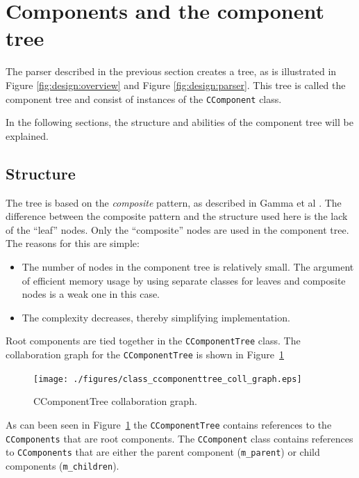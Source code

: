 \section{Components and the component tree} \label{sect:design:components}
The parser described in the previous section creates a tree, as is illustrated
in Figure \ref{fig:design:overview} and Figure \ref{fig:design:parser}. This
tree is called the component tree and consist of instances of the
\verb=CComponent= class.

In the following sections, the structure and abilities of the component tree
will be explained.

\subsection{Structure}
The tree is based on the \emph{composite} pattern, as described in Gamma et al
\cite{Gamma}. The difference between the composite pattern and the structure
used here is the lack of the ``leaf'' nodes. Only the ``composite'' nodes are
used in the component tree. The reasons for this are simple:
\begin{itemize}
\item The number of nodes in the component tree is relatively small. The
argument of efficient memory usage by using separate classes for leaves and
composite nodes is a weak one in this case.
\item The complexity decreases, thereby simplifying implementation.
\end{itemize}
Root components are tied together in the \verb=CComponentTree= class. The
collaboration graph for the \verb=CComponentTree= is shown in \mbox{Figure
\ref{fig:doxygen:CComponentTree_coll}}

\begin{figure}[ht]
\begin{center}
\texttt{[image: ./figures/class\_ccomponenttree\_coll\_graph.eps]}
\caption{CComponentTree collaboration graph.}
\label{fig:doxygen:CComponentTree_coll}
\end{center}
\end{figure}
As can been seen in \mbox{Figure \ref{fig:doxygen:CComponentTree_coll}} the
\verb=CComponentTree= contains references to the \verb=CComponents= that are
root components. The \verb=CComponent= class contains references to
\verb=CComponents= that are either the parent component (\verb=m_parent=) or
child components (\verb=m_children=).

